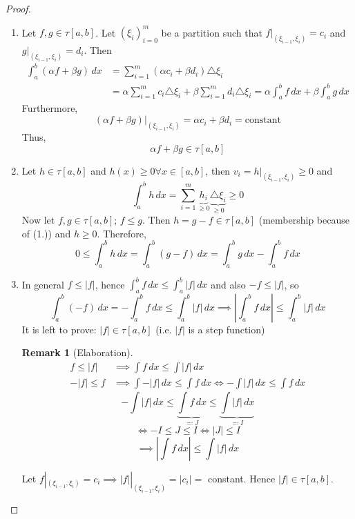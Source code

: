 \documentclass{article}
\newtheorem{remark}{Remark}  \numberwithin{remark}{section}
\newcommand{\card}[1]{\left|#1\right|}
\begin{document}
\begin{proof}
  \begin{enumerate}
    \item
      Let $f,g \in \tau[a,b]$. Let $(\xi_i)_{i=0}^m$ be a partition such that
      $f|_{(\xi_{i-1},\xi_i)} = c_i$ and $g|_{(\xi_{i-1},\xi_i)} = d_i$.
      Then
      \begin{align*}
        \int_a^b (\alpha f + \beta g) \, dx
          &= \sum_{i=1}^m (\alpha c_i + \beta d_i) \triangle \xi_i \\
          &= \alpha \sum_{i=1}^m c_i \triangle \xi_i + \beta \sum_{i=1}^m d_i \triangle \xi_i
          = \alpha \int_a^b f \, dx + \beta \int_a^b g \, dx
      \end{align*}
      Furthermore,
      \[ (\alpha f + \beta g)|_{(\xi_{i-1},\xi_i)} = \alpha c_i + \beta d_i = \text{constant} \]
      Thus,
      \[ \alpha f + \beta g \in \tau[a,b] \]
    \item
      Let $h \in \tau[a,b]$ and $h(x) \geq 0 \forall x \in [a,b]$,
      then $v_i = h|_{(\xi_{i-1}, \xi_i)} \geq 0$ and
      \[ \int_a^b h \, dx = \sum_{i=1}^m \underbrace{h_i}_{\geq 0} \underbrace{\triangle \xi_i}_{\geq 0} \geq 0 \]
      Now let $f, g \in \tau[a,b]$; $f \leq g$. Then $h = g - f \in \tau[a,b]$ (membership because of (1.)) and $h \geq 0$.
      Therefore,
      \[ 0 \leq \int_a^b h \, dx = \int_a^b (g - f) \, dx = \int_a^b g \, dx - \int_a^b f \, dx \]
    \item
      In general $f \leq \card{f}$, hence $\int_a^b f \, dx \leq \int_a^b \card{f} \, dx$ and also
      $-f \leq \card{f}$, so
      \[ \int_a^b (-f) \, dx = -\int_a^b f \, dx \leq \int_a^b \card{f} \, dx
         \implies \card{\int_a^b f \, dx} \leq \int_a^b \card{f} \, dx \]
      It is left to prove: $\card{f} \in \tau[a,b]$ (i.e. $\card{f}$ is a step function)

      \begin{remark}[Elaboration]
        \begin{align*}
           f \leq \card{f} &\implies \int f \, dx \leq \int \card{f} \, dx \\
           -\card{f} \leq f &\implies \int -\card{f} \, dx \leq \int f \, dx \iff -\int \card{f} \, dx \leq \int f \, dx
        \end{align*}
        \[ -\int \card{f} \, dx \leq \underbrace{\int f \, dx}_{\eqqcolon J} \leq \underbrace{\int \card{f} \, dx}_{\eqqcolon I} \]
        \[ \iff -I \leq J \leq I \iff \card{J} \leq I \]
        \[ \implies \card{\int f \, dx} \leq \int \card{f} \, dx \]
      \end{remark}

      Let $f|_{(\xi_{i-1}, \xi_i)} = c_i \implies \card{f}|_{(\xi_{i-1}, \xi_i)} = \card{c_i} = $ constant.
      Hence $\card{f} \in \tau[a,b]$.
  \end{enumerate}
\end{proof}
\end{document}
